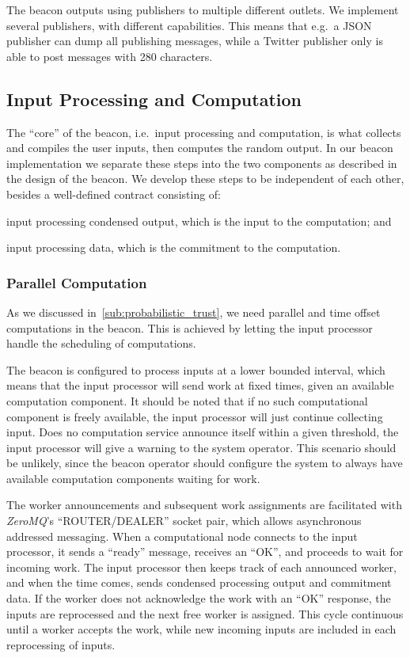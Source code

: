 The beacon outputs using publishers to multiple different outlets.
We implement several publishers, with different capabilities.
This means that e.g.\ a JSON publisher can dump all publishing messages, while a Twitter publisher only is able to post messages with 280 characters.

\subsection{Input Processing and Computation}%
\label{sub:input_processing_and_computation}
The \enquote{core} of the beacon, i.e.\ input processing and computation, is what collects and compiles the user inputs, then computes the random output.
In our beacon implementation we separate these steps into the two components as described in the design of the beacon.
We develop these steps to be independent of each other, besides a well-defined contract consisting of:
\begin{eletterate*}
\item input processing condensed output, which is the input to the computation; and
\item input processing data, which is the commitment to the computation.
\end{eletterate*}

\subsubsection{Parallel Computation}%
\label{ssub:parallel_computation}
As we discussed in~\cref{sub:probabilistic_trust}, we need parallel and time offset computations in the beacon.
This is achieved by letting the input processor handle the scheduling of computations.

The beacon is configured to process inputs at a lower bounded interval, which means that the input processor will send work at fixed times, given an available computation component.
It should be noted that if no such computational component is freely available, the input processor will just continue collecting input.
Does no computation service announce itself within a given threshold, the input processor will give a warning to the system operator.
This scenario should be unlikely, since the beacon operator should configure the system to always have available computation components waiting for work.

The worker announcements and subsequent work assignments are facilitated with \textit{ZeroMQ}'s \enquote{ROUTER/DEALER} socket pair, which allows asynchronous addressed messaging.
When a computational node connects to the input processor, it sends a \enquote{ready} message, receives an \enquote{OK}, and proceeds to wait for incoming work.
The input processor then keeps track of each announced worker, and when the time comes, sends condensed processing output and commitment data.
If the worker does not acknowledge the work with an \enquote{OK} response, the inputs are reprocessed and the next free worker is assigned.
This cycle continuous until a worker accepts the work, while new incoming inputs are included in each reprocessing of inputs.

